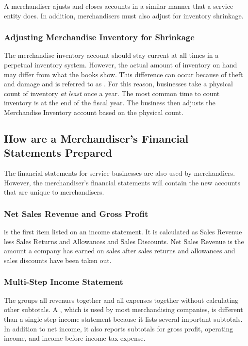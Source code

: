 \documentclass{article}
\begin{document}
A merchandiser ajusts and closes accounts in a similar manner that a service entity does. In addition, merchandisers must also adjust for inventory shrinkage. 

\subsubsection{Adjusting Merchandise Inventory for Shrinkage}

The merchandise inventory account should stay current at all times in a perpetual inventory system. However, the actual amount of inventory on hand may differ from what the books show. This difference can occur because of theft and damage and is referred to as . For this reason, businesses take a physical count of inventory \emph{at least} once a year. The most common time to count inventory is at the end of the fiscal year. The business then adjusts the Merchandise Inventory account based on the physical count.

\subsection{How are a Merchandiser's Financial Statements Prepared}

The financial statements for service businesses are also used by merchandiers. However, the merchandiser's financial statements will contain the new accounts that are unique to merchandisers. \\ 

\subsubsection{Net Sales Revenue and Gross Profit}

 is the first item listed on an income statement. It is calculated as Sales Revenue less Sales Returns and Allowances and Sales Discounts. Net Sales Revenue is the amount a company has earned on sales after sales returns and allowances and sales discounts have been taken out. 

\subsubsection{Multi-Step Income Statement}

The  groups all revenues together and all expenses together without calculating other subtotals. A , which is used by most merchandising companies, is different than a single-step income statement because it lists several important subtotals. In addition to net income, it also reports subtotals for gross profit, operating income, and income before income tax expense. \\ 
\end{document}
